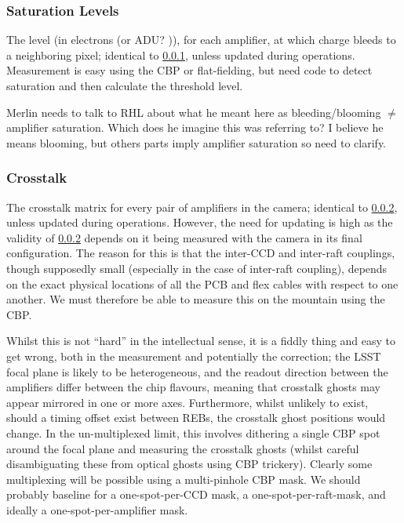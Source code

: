 \subsubsection{Saturation Levels}\label{calibProducts:saturationLevel}
The level (in electrons (or ADU? \xxx)), for each amplifier, at which charge bleeds to a neighboring pixel; identical to \ref{calibProducts:saturationLevel}, unless updated during operations.
\alg Measurement is easy using the CBP or flat-fielding, but need code to detect saturation and then calculate the threshold level.
\begin{note}
	Merlin needs to talk to RHL about what he meant here as bleeding/blooming $\neq$ amplifier saturation. Which does he imagine this was referring to? I believe he means blooming, but others parts imply amplifier saturation so need to clarify.
\end{note}



\subsubsection{Crosstalk}\label{calibProducts:crosstalk}
The crosstalk matrix for every pair of amplifiers in the camera; identical to \ref{calibProducts:crosstalk}, unless updated during operations. However, the need for updating is high as the validity of \ref{calibProducts:crosstalk} depends on it being measured with the camera in its final configuration. The reason for this is that the inter-CCD and inter-raft couplings, though supposedly small (especially in the case of inter-raft coupling), depends on the exact physical locations of all the PCB and flex cables with respect to one another. We must therefore be able to measure this on the mountain using the CBP.

Whilst this is not ``hard'' in the intellectual sense, it is a fiddly thing and easy to get wrong, both in the measurement and potentially the correction; the LSST focal plane is likely to be heterogeneous, and the readout direction between the amplifiers differ between the chip flavours, meaning that crosstalk ghosts may appear mirrored in one or more axes. Furthermore, whilst unlikely to exist, should a timing offset exist between REBs, the crosstalk ghost positions would change.
\alg In the un-multiplexed limit, this involves dithering a single CBP spot around the focal plane and measuring the crosstalk ghosts (whilst careful disambiguating these from optical ghosts using CBP trickery). Clearly some multiplexing will be possible using a multi-pinhole CBP mask. We should probably baseline for a one-spot-per-CCD mask, a one-spot-per-raft-mask, and ideally a one-spot-per-amplifier mask.


